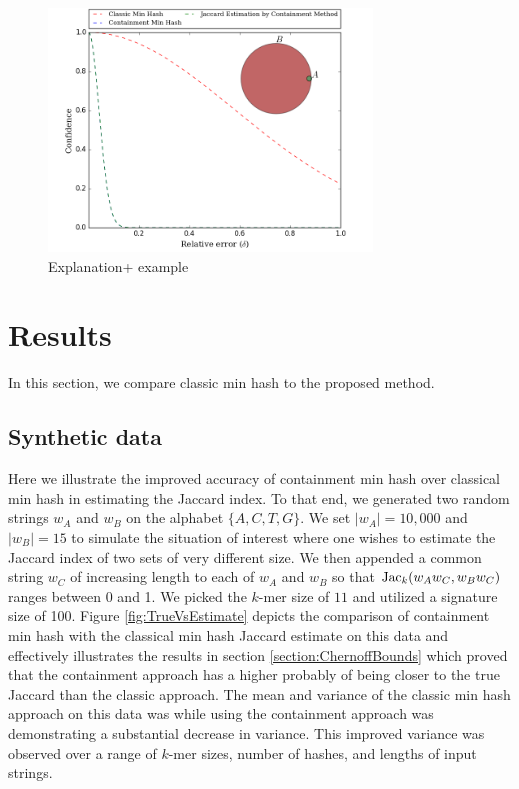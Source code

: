 \documentclass[11pt]{amsart}
\theoremstyle{remark}
\numberwithin{equation}{section}
\newcommand{\themethod}{containment min hash }
\DeclareMathOperator{\Jac}{{\rm Jac}}
\newcommand{\SyntheticDataClassic}{\protect }
\newcommand{\SyntheticDataContainment}{\protect }
\begin{document}
\begin{figure}[!h]
\begin{center}
\hspace{-.327in}
\includegraphics[width=3.39in,trim={0 0 0 0in},clip]{Figs/deltaConfident-20090.png}
\end{center}
\caption{Explanation+ example }
\label{fig:DeltaK}%
\end{figure}


\section{Results}
In this section, we compare classic min hash to the proposed method.
\subsection{Synthetic data}
\label{section:SyntheticData}
Here we illustrate the improved accuracy of \themethod over classical min hash in estimating the Jaccard index. To that end, we generated two random strings $w_A$ and $w_B$ on the alphabet $\{A,C,T,G\}$. We set $|w_A|= 10,000$ and $|w_B| = 15$ to simulate the situation of interest where one wishes to estimate the Jaccard index of two sets of very different size. We then appended a common string $w_C$ of increasing length to each of $w_A$ and $w_B$ so that $\Jac_k(w_Aw_C, w_Bw_C)$ ranges between 0 and 1. We picked the $k$-mer size of $11$ and utilized a signature size of 100. Figure \ref{fig:TrueVsEstimate} depicts the comparison of \themethod with the classical min hash Jaccard estimate on this data and effectively illustrates the results in section \ref{section:ChernoffBounds} which proved that the containment approach has a higher probably of being closer to the true Jaccard than the classic approach. The mean and variance of the classic min hash approach on this data was \SyntheticDataClassic while using the containment approach was \SyntheticDataContainment demonstrating a substantial decrease in variance. This improved variance was observed over a range of $k$-mer sizes, number of hashes, and lengths of input strings.
\end{document}
